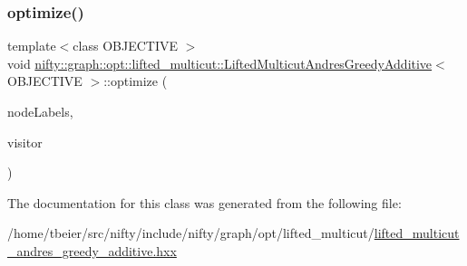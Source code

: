 \subsubsection{\texorpdfstring{optimize()}{optimize()}}
{\footnotesize\ttfamily template$<$class O\+B\+J\+E\+C\+T\+I\+VE $>$ \\
void \hyperlink{classnifty_1_1graph_1_1opt_1_1lifted__multicut_1_1LiftedMulticutAndresGreedyAdditive}{nifty\+::graph\+::opt\+::lifted\+\_\+multicut\+::\+Lifted\+Multicut\+Andres\+Greedy\+Additive}$<$ O\+B\+J\+E\+C\+T\+I\+VE $>$\+::optimize (\begin{DoxyParamCaption}\item[{\hyperlink{classnifty_1_1graph_1_1opt_1_1lifted__multicut_1_1LiftedMulticutAndresGreedyAdditive_ae5dcc77ffcf6364667033052f43327e8}{Node\+Labels\+Type} \&}]{node\+Labels,  }\item[{\hyperlink{classnifty_1_1graph_1_1opt_1_1lifted__multicut_1_1LiftedMulticutAndresGreedyAdditive_aaec5054a53fdbf048b7e2b63959db03e}{Visitor\+Base\+Type} $\ast$}]{visitor }\end{DoxyParamCaption})\hspace{0.3cm}{\ttfamily [virtual]}}



The documentation for this class was generated from the following file\+:\begin{DoxyCompactItemize}
\item 
/home/tbeier/src/nifty/include/nifty/graph/opt/lifted\+\_\+multicut/\hyperlink{lifted__multicut__andres__greedy__additive_8hxx}{lifted\+\_\+multicut\+\_\+andres\+\_\+greedy\+\_\+additive.\+hxx}\end{DoxyCompactItemize}

